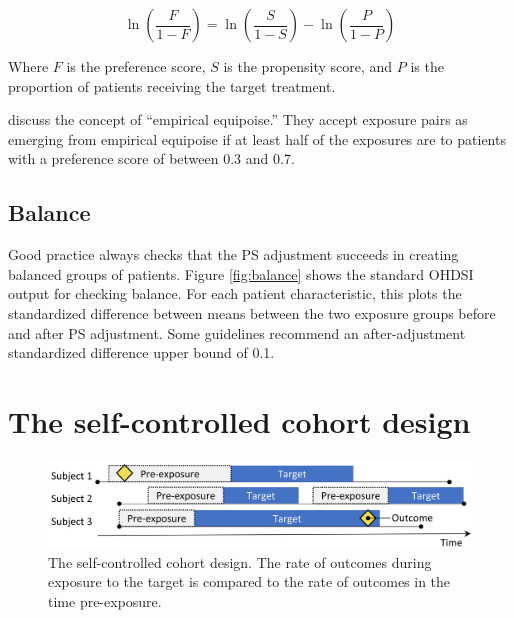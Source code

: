 \documentclass[11pt]{book}
\theoremstyle{definition}
\theoremstyle{definition}
\theoremstyle{definition}
\theoremstyle{remark}
\begin{document}
\[\ln\left(\frac{F}{1-F}\right)=\ln\left(\frac{S}{1-S}\right)-\ln\left(\frac{P}{1-P}\right)\]

Where \(F\) is the preference score, \(S\) is the propensity score, and \(P\) is the proportion of patients receiving the target treatment.

\citet{walker_2013} discuss the concept of ``empirical equipoise.'' They accept exposure pairs as emerging from empirical equipoise if at least half of the exposures are to patients with a preference score of between 0.3 and 0.7. 

\hypertarget{balance}{%
\subsection{Balance}\label{balance}}

 

Good practice always checks that the PS adjustment succeeds in creating balanced groups of patients. Figure \ref{fig:balance} shows the standard OHDSI output for checking balance. For each patient characteristic, this plots the standardized difference between means between the two exposure groups before and after PS adjustment. Some guidelines recommend an after-adjustment standardized difference upper bound of 0.1. \citep{rubin_2001}

\hypertarget{the-self-controlled-cohort-design}{%
\section{The self-controlled cohort design}\label{the-self-controlled-cohort-design}}


\begin{figure}

{\centering \includegraphics[width=0.9\linewidth]{images/PopulationLevelEstimation/selfControlledCohort} 

}

\caption{The self-controlled cohort design. The rate of outcomes during exposure to the target is compared to the rate of outcomes in the time pre-exposure.}\label{fig:scc}
\end{figure}
\end{document}
